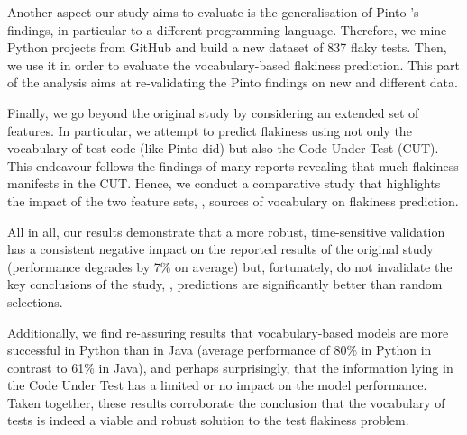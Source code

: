 Another aspect our study aims to evaluate is the generalisation of Pinto \etal's findings, in particular to a different programming language. Therefore, we mine Python projects from GitHub and build a new dataset of 837 flaky tests. Then, we use it in order to evaluate the vocabulary-based flakiness prediction. This part of the analysis aims at re-validating the Pinto \etal findings on new and different data. 

Finally, we go beyond the original study by considering an extended set of features. In particular, we attempt to predict flakiness using not only the vocabulary of test code (like Pinto \etal did) but also the Code Under Test (CUT). This endeavour follows the findings of many reports\cite{Luo2014,Thorve2018,Lam2020b} revealing that much flakiness manifests in the CUT. Hence, we conduct a comparative study that highlights the impact of the two feature sets, \ie, sources of vocabulary on flakiness prediction.

All in all, our results demonstrate that a more robust, time-sensitive validation has a consistent negative impact on the reported results of the original study (performance degrades by 7\% on average) but, fortunately, do not invalidate the key conclusions of the study, \ie, predictions are significantly better than random selections. 

Additionally, we find re-assuring results that vocabulary-based models are more successful in Python than in Java (average performance of 80\% in Python in contrast to 61\% in Java), and perhaps surprisingly, that the information lying in the Code Under Test has a limited or no impact on the model performance. Taken together, these results corroborate the conclusion that the vocabulary of tests is indeed a viable and robust solution to the test flakiness problem.    
